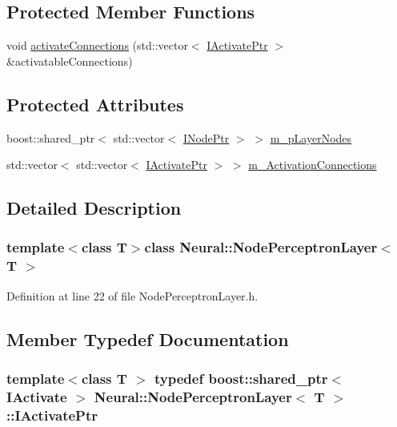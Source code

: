 \subsection*{Protected Member Functions}
\begin{DoxyCompactItemize}
\item 
void \hyperlink{class_neural_1_1_node_perceptron_layer_a557fefb5139551317e257340a5603e07}{activateConnections} (std::vector$<$ \hyperlink{class_neural_1_1_node_perceptron_layer_a9806fd97604fe80f25365bd676329c5c}{IActivatePtr} $>$ \&activatableConnections)
\end{DoxyCompactItemize}
\subsection*{Protected Attributes}
\begin{DoxyCompactItemize}
\item 
boost::shared\_\-ptr$<$ std::vector$<$ \hyperlink{class_neural_1_1_i_node_layer_a31357b3a61112d5c534c52693ffba054}{INodePtr} $>$ $>$ \hyperlink{class_neural_1_1_node_perceptron_layer_a9439fce206cbf489b864f4c8818c32e5}{m\_\-pLayerNodes}
\item 
std::vector$<$ std::vector$<$ \hyperlink{class_neural_1_1_node_perceptron_layer_a9806fd97604fe80f25365bd676329c5c}{IActivatePtr} $>$ $>$ \hyperlink{class_neural_1_1_node_perceptron_layer_a464ec62bde0bc4d28e81042b19d95bbd}{m\_\-ActivationConnections}
\end{DoxyCompactItemize}


\subsection{Detailed Description}
\subsubsection*{template$<$class T$>$class Neural::NodePerceptronLayer$<$ T $>$}



Definition at line 22 of file NodePerceptronLayer.h.



\subsection{Member Typedef Documentation}
\hypertarget{class_neural_1_1_node_perceptron_layer_a9806fd97604fe80f25365bd676329c5c}{
\subsubsection[{IActivatePtr}]{\setlength{\rightskip}{0pt plus 5cm}template$<$class T $>$ typedef boost::shared\_\-ptr$<$ {\bf IActivate} $>$ {\bf Neural::NodePerceptronLayer}$<$ T $>$::{\bf IActivatePtr}}}
\label{class_neural_1_1_node_perceptron_layer_a9806fd97604fe80f25365bd676329c5c}



